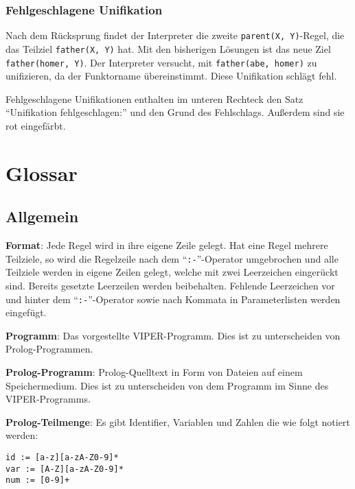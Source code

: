 \documentclass[parskip=full,11pt,twoside]{scrartcl}
\begin{document}
\subsubsection{Fehlgeschlagene Unifikation}

Nach dem Rücksprung findet der Interpreter die zweite \texttt{parent(X, Y)}-Regel, die das Teilziel \texttt{father(X, Y)} hat.
Mit den bisherigen Lösungen ist das neue Ziel \texttt{father(homer, Y)}.
Der Interpreter versucht, mit \texttt{father(abe, homer)} zu unifizieren, da der Funktorname übereinstimmt.
Diese Unifikation schlägt fehl.

\begin{minipage}{\linewidth}
\end{minipage}

Fehlgeschlagene Unifikationen enthalten im unteren Rechteck den Satz \enquote{Unifikation fehlgeschlagen:} und den Grund des Fehlschlags.
Außerdem sind sie rot eingefärbt.

\section{Glossar}

\subsection{Allgemein}

\textbf{Format}:
Jede Regel wird in ihre eigene Zeile gelegt. Hat eine Regel mehrere Teilziele, so wird die Regelzeile nach dem \enquote{\texttt{:-}}-Operator umgebrochen und alle Teilziele werden in eigene Zeilen gelegt, welche mit zwei Leerzeichen eingerückt sind. Bereits gesetzte Leerzeilen werden beibehalten. Fehlende Leerzeichen vor und hinter dem \enquote{\texttt{:-}}-Operator sowie nach Kommata in Parameterlisten werden eingefügt.

\textbf{Programm}:
Das vorgestellte VIPER-Programm. Dies ist zu unterscheiden von Prolog-Programmen.

\textbf{Prolog-Programm}:
Prolog-Quelltext in Form von Dateien auf einem Speichermedium. Dies ist zu unterscheiden von dem Programm im Sinne des VIPER-Programms.

\textbf{Prolog-Teilmenge}:
Es gibt Identifier, Variablen und Zahlen die wie folgt notiert werden:

\begin{lstlisting}
id := [a-z][a-zA-Z0-9]*
var := [A-Z][a-zA-Z0-9]*
num := [0-9]+
\end{lstlisting}
\end{document}
